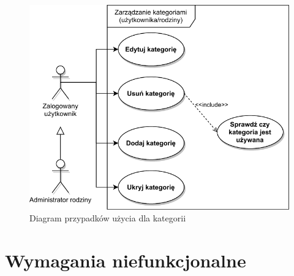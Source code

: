 \begin{figure}[t]
	\centering
	\includegraphics[width=.65\linewidth]{rys03/use-case-category-2.pdf}
	\caption{Diagram przypadków użycia dla kategorii}
	\label{fig:use-case-category}
\end{figure}

\section{Wymagania niefunkcjonalne}
\label{sec:wymagania-niefunkcjonalne}

